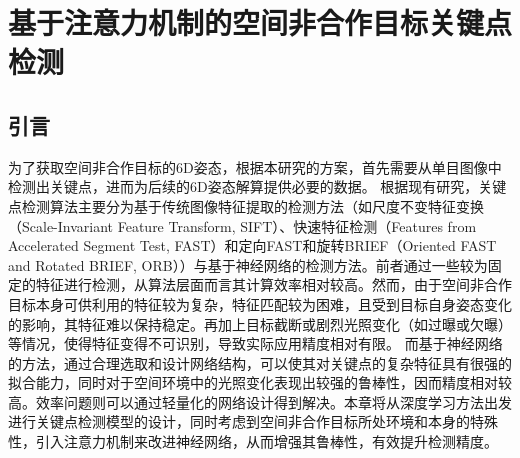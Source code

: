 \chapter{基于注意力机制的空间非合作目标关键点检测}
\label{chap:attention_kpt}
\section{引言}
为了获取空间非合作目标的6D姿态，根据本研究的方案，首先需要从单目图像中检测出关键点，进而为后续的6D姿态解算提供必要的数据。
根据现有研究，关键点检测算法主要分为基于传统图像特征提取的检测方法（如尺度不变特征变换（Scale-Invariant Feature Transform, SIFT）\citep{sift}、快速特征检测（Features from Accelerated Segment Test, FAST）\citep{fast}和定向FAST和旋转BRIEF（Oriented FAST and Rotated BRIEF, ORB）\citep{orb}）与基于神经网络的检测方法。前者通过一些较为固定的特征进行检测，从算法层面而言其计算效率相对较高。然而，由于空间非合作目标本身可供利用的特征较为复杂，特征匹配较为困难，且受到目标自身姿态变化的影响，其特征难以保持稳定。再加上目标截断或剧烈光照变化（如过曝或欠曝）等情况，使得特征变得不可识别，导致实际应用精度相对有限。
而基于神经网络的方法，通过合理选取和设计网络结构，可以使其对关键点的复杂特征具有很强的拟合能力，同时对于空间环境中的光照变化表现出较强的鲁棒性，因而精度相对较高。效率问题则可以通过轻量化的网络设计得到解决。本章将从深度学习方法出发进行关键点检测模型的设计，同时考虑到空间非合作目标所处环境和本身的特殊性，引入注意力机制来改进神经网络，从而增强其鲁棒性，有效提升检测精度。
